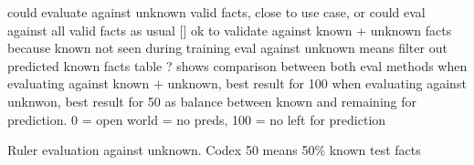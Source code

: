 could evaluate against unknown valid facts, close to use case, or could eval against all valid facts as usual []
ok to validate against known + unknown facts because known not seen during training
eval against unknown means filter out predicted known facts
table ? shows comparison between both eval methods
when evaluating against known + unknown, best result for 100
when evaluating against unknwon, best result for 50 as balance between known and remaining for prediction. 0 = open world = no preds, 100 = no left for prediction

\begin{table}
    \centering
    
    \caption{Ruler evaluation against unknown. Codex 50 means 50\% known test facts}
    \label{tab:5_experiments/5_ruler/1_unknown/results}
\end{table}
